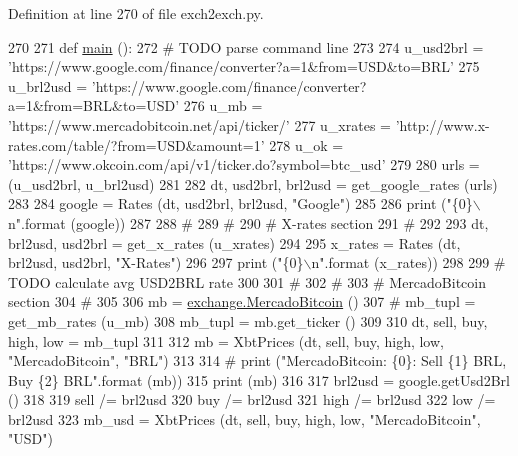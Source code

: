 Definition at line 270 of file exch2exch.\-py.


\begin{DoxyCode}
270 
271 \textcolor{keyword}{def }\hyperlink{namespaceexch2exch_a559f55b08d308a647cc4afa3620e2da8}{main} ():
272     \textcolor{comment}{# TODO parse command line }
273 
274     u\_usd2brl = \textcolor{stringliteral}{'https://www.google.com/finance/converter?a=1&from=USD&to=BRL'}
275     u\_brl2usd = \textcolor{stringliteral}{'https://www.google.com/finance/converter?a=1&from=BRL&to=USD'}
276     u\_mb      = \textcolor{stringliteral}{'https://www.mercadobitcoin.net/api/ticker/'}
277     u\_xrates  = \textcolor{stringliteral}{'http://www.x-rates.com/table/?from=USD&amount=1'}
278     u\_ok      = \textcolor{stringliteral}{'https://www.okcoin.com/api/v1/ticker.do?symbol=btc\_usd'}
279     
280     urls = (u\_usd2brl, u\_brl2usd)
281     
282     dt, usd2brl, brl2usd = get\_google\_rates (urls)
283     
284     google = Rates (dt, usd2brl, brl2usd, \textcolor{stringliteral}{"Google"})
285     
286     \textcolor{keywordflow}{print} (\textcolor{stringliteral}{"\{0\}\(\backslash\)n"}.format (google))
287     
288     \textcolor{comment}{#}
289     \textcolor{comment}{#}
290     \textcolor{comment}{# X-rates section }
291     \textcolor{comment}{# }
292     
293     dt, brl2usd, usd2brl = get\_x\_rates (u\_xrates)
294     
295     x\_rates = Rates (dt, brl2usd, usd2brl, \textcolor{stringliteral}{"X-Rates"})
296     
297     \textcolor{keywordflow}{print} (\textcolor{stringliteral}{"\{0\}\(\backslash\)n"}.format (x\_rates))
298     
299     \textcolor{comment}{# TODO calculate avg USD2BRL rate}
300     
301     \textcolor{comment}{#}
302     \textcolor{comment}{#}
303     \textcolor{comment}{# MercadoBitcoin section }
304     \textcolor{comment}{# }
305     
306     mb = \hyperlink{classexchange_1_1_mercado_bitcoin}{exchange.MercadoBitcoin} ()    
307 \textcolor{comment}{#    mb\_tupl = get\_mb\_rates (u\_mb)}
308     mb\_tupl = mb.get\_ticker ()
309     
310     dt, sell, buy, high, low = mb\_tupl
311     
312     mb = XbtPrices (dt, sell, buy, high, low, \textcolor{stringliteral}{"MercadoBitcoin"}, \textcolor{stringliteral}{"BRL"})
313     
314     \textcolor{comment}{# print ("MercadoBitcoin: \{0\}: Sell \{1\} BRL, Buy \{2\} BRL".format (mb))}
315     \textcolor{keywordflow}{print} (mb)
316      
317     brl2usd = google.getUsd2Brl ()
318     
319     sell /= brl2usd
320     buy  /= brl2usd 
321     high /= brl2usd
322     low  /= brl2usd 
323     mb\_usd = XbtPrices (dt, sell, buy, high, low, \textcolor{stringliteral}{"MercadoBitcoin"}, \textcolor{stringliteral}{"USD"})

\end{DoxyCode}
